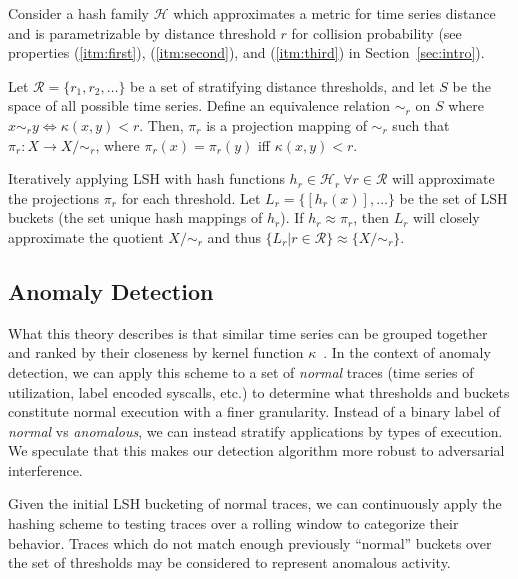 \documentclass[a4paper]{article}
\begin{document}
Consider a hash family $\mathcal{H}$ which approximates a metric for time series distance and is parametrizable by distance threshold $r$ for collision probability (see properties (\ref{itm:first}), (\ref{itm:second}), and (\ref{itm:third}) in Section~\ref{sec:intro}).

Let $\mathcal{R} = \{r_1, r_2, \ldots\}$ be a set of stratifying distance thresholds, and let $S$ be the space of all possible time series.
Define an equivalence relation $\sim_r$ on $S$ where $x \sim_r y \Leftrightarrow \kappa(x,y) < r$.
Then, $\pi_r$ is a projection mapping of $\sim_r$ such that $\pi_r \colon X \rightarrow X/\sim_r$, where $\pi_r(x) = \pi_r(y)$ iff $\kappa(x,y) < r$.

Iteratively applying LSH with hash functions $h_r \in \mathcal{H}_r~\forall r\in \mathcal{R}$ will approximate the projections $\pi_r$ for each threshold.
Let $L_r = \{[h_r(x)], \ldots \}$ be the set of LSH buckets (the set unique hash mappings of $h_r$).
If $h_r \approx \pi_r$, then $L_r$ will closely approximate the quotient $X/\sim_r$ and thus $\{L_r | r \in \mathcal{R} \} \approx \{X/\sim_r\}$.

\subsection{Anomaly Detection}
\label{subsec:anomaly_detection}

What this theory describes is that similar time series can be grouped together and ranked by their closeness by kernel function $\kappa$~\cite{Hachiya13-NSH}.
In the context of anomaly detection, we can apply this scheme to a set of \textit{normal} traces (time series of utilization, label encoded syscalls, etc.) to determine what thresholds and buckets constitute normal execution with a finer granularity.
Instead of a binary label of \textit{normal} vs \textit{anomalous}, we can instead stratify applications by types of execution.
We speculate that this makes our detection algorithm more robust to adversarial interference.

Given the initial LSH bucketing of normal traces, we can continuously apply the hashing scheme to testing traces over a rolling window to categorize their behavior.
Traces which do not match enough previously ``normal'' buckets over the set of thresholds may be considered to represent anomalous activity.
\end{document}

